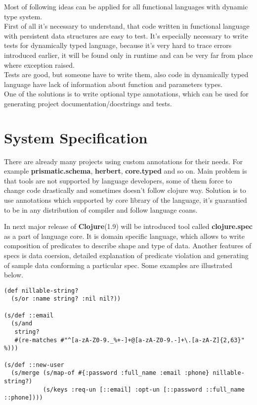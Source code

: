 \documentclass[12pt,a4paper]{report}
\begin{document}
Most of following ideas can be applied for all functional languages with dynamic type system.\\

First of all it's necessary to understand, that code written in functional
language with persistent data structures are easy to test. It's especially
necessary to write tests for dynamically typed language, because it's very
hard to trace errors introduced earlier, it will be found only in runtime
and can be very far from place where exception raised. \\

Tests are good, but someone have to write them, also code in dynamically
typed language have lack of information about function and parameters
types.\\

One of the solutions is to write optional type annotations,
which can be used for generating project documentation/docstrings
and tests.

\section*{System Specification}

There are already many projects using custom annotations for their needs. For
example \textbf{prismatic.schema}, \textbf{herbert}, \textbf{core.typed} and so
on. Main problem is that tools are not supported by language developers, some
of them force to change code drastically and sometimes doesn't follow clojure
way. Solution is to use annotations which supported by core library of the
language, it's guarantied to be in any distribution of compiler and follow
language coans.

In next major release of \textbf{Clojure}(1.9) will be introduced tool called
\textbf{clojure.spec} as a part of language core. It is domain specific
language, which allows to write composition of predicates to describe shape and
type of data. Another features of specs is data coersion, detailed explanation
of predicate violation and generating of sample data conforming a particular
spec. Some examples are illustrated below. \\

\begin{verbatim}
(def nillable-string?
  (s/or :name string? :nil nil?))

(s/def ::email
  (s/and
   string?
   #(re-matches #"^[a-zA-Z0-9._%+-]+@[a-zA-Z0-9.-]+\.[a-zA-Z]{2,63}" %)))

(s/def ::new-user
  (s/merge (s/map-of #{:password :full_name :email :phone} nillable-string?)
           (s/keys :req-un [::email] :opt-un [::password ::full_name ::phone])))
\end{verbatim}
\end{document}
